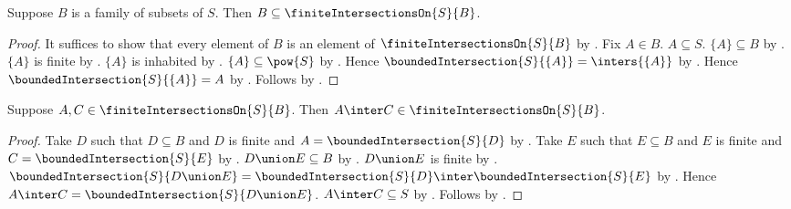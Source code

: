 \begin{proposition}\label{generators_in_finite_intersections_on}
    Suppose $B$ is a family of subsets of $S$.
    Then $B\subseteq\finiteIntersectionsOn{S}{B}$.
\end{proposition}
\begin{proof}
    It suffices to show that every element of $B$ is an element of
        $\finiteIntersectionsOn{S}{B}$ by .
    Fix $A\in B$.
    $A\subseteq S$.
    $\{A\}\subseteq B$ by .
    $\{A\}$ is finite by .
    $\{A\}$ is inhabited by .
    $\{A\}\subseteq\pow{S}$ by
        .
    Hence $\boundedIntersection{S}{\{A\}}=\inters{\{A\}}$
        by .
    Hence $\boundedIntersection{S}{\{A\}}=A$ by
        .
    Follows by .
\end{proof}

\begin{proposition}\label{finite_intersections_on_intersection}
    Suppose $A,C\in\finiteIntersectionsOn{S}{B}$.
    Then $A\inter C\in\finiteIntersectionsOn{S}{B}$.
\end{proposition}
\begin{proof}
    Take $D$ such that $D\subseteq B$ and $D$ is finite and
        $A=\boundedIntersection{S}{D}$
        by .
    Take $E$ such that $E\subseteq B$ and $E$ is finite and
        $C=\boundedIntersection{S}{E}$
        by .
    $D\union E\subseteq B$ by .
    $D\union E$ is finite by .
    $\boundedIntersection{S}{D\union E}
        =\boundedIntersection{S}{D}\inter
            \boundedIntersection{S}{E}$
        by .
    Hence $A\inter C=\boundedIntersection{S}{D\union E}$.
    $A\inter C\subseteq S$ by
        .
    Follows by .
\end{proof}

